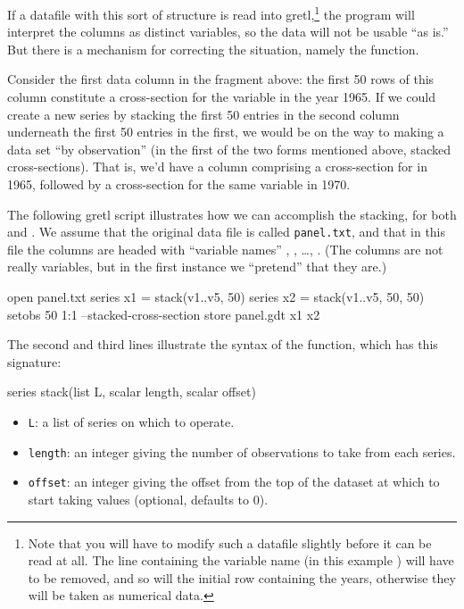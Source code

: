 If a datafile with this sort of structure is read into
gretl,\footnote{Note that you will have to modify such a
  datafile slightly before it can be read at all.  The line containing
  the variable name (in this example ) will have to be
  removed, and so will the initial row containing the years,
  otherwise they will be taken as numerical data.}  the program
will interpret the columns as distinct variables, so the data will not
be usable ``as is.''  But there is a mechanism for correcting the
situation, namely the  function.

Consider the first data column in the fragment above: the first 50 rows
of this column constitute a cross-section for the variable 
in the year 1965.  If we could create a new series by stacking the
first 50 entries in the second column underneath the first 50 entries
in the first, we would be on the way to making a data set ``by
observation'' (in the first of the two forms mentioned above, stacked
cross-sections).  That is, we'd have a column comprising a
cross-section for  in 1965, followed by a cross-section for
the same variable in 1970.

The following gretl script illustrates how we can accomplish the
stacking, for both  and .  We assume
that the original data file is called \texttt{panel.txt}, and that in
this file the columns are headed with ``variable names'' ,
, \dots, .  (The columns are not really
variables, but in the first instance we ``pretend'' that they are.)

\begin{code}
open panel.txt
series x1 = stack(v1..v5, 50)
series x2 = stack(v1..v5, 50, 50)
setobs 50 1:1 --stacked-cross-section
store panel.gdt x1 x2
\end{code}

The second and third lines illustrate the syntax of the 
function, which has this signature:
\begin{code}
series stack(list L, scalar length, scalar offset)
\end{code}
\begin{itemize}
\item \texttt{L}: a list of series on which to operate.
\item \texttt{length}: an integer giving the number of observations to
  take from each series.
\item \texttt{offset}: an integer giving the offset from the top of
  the dataset at which to start taking values (optional, defaults to
  0).
\end{itemize}

